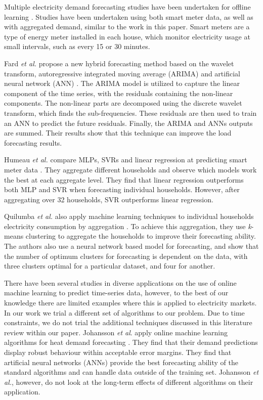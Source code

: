 \documentclass[final,3p,times,twocolumn,numbers]{elsarticle}
\begin{document}
Multiple electricity demand forecasting studies have been undertaken for offline learning \cite{Chen2004, Gross1987, Ghofrani}. Studies have been undertaken using both smart meter data, as well as with aggregated demand, similar to the work in this paper. Smart meters are a type of energy meter installed in each house, which monitor electricity usage at small intervals, such as every 15 or 30 minutes.

Fard \textit{et al.} propose a new hybrid forecasting method based on the wavelet transform, autoregressive integrated moving average (ARIMA) and artificial neural network (ANN) \cite{Fard2014}. The ARIMA model is utilized to capture the linear component of the time series, with the residuals containing the non-linear components. The non-linear parts are decomposed using the discrete wavelet transform, which finds the sub-frequencies. These residuals are then used to train an ANN  to predict the future residuals. Finally, the ARIMA and ANNs outputs are summed. Their results show that this technique can improve the load forecasting results.	

Humeau \textit{et al.} compare MLPs, SVRs and linear regression at predicting smart meter data \cite{Humeau2013}. They aggregate different households and observe which models work the best at each aggregate level. They find that linear regression outperforms both MLP and SVR when forecasting individual households. However, after aggregating over 32 households, SVR outperforms linear regression.


Quilumba \textit{et al.} also apply machine learning techniques to individual households electricity consumption by aggregation \cite{Fard2014}. To achieve this aggregation, they use \textit{k}-means clustering to aggregate the households to improve their forecasting ability. The authors also use a neural network based model for forecasting, and show that the number of optimum clusters for forecasting is dependent on the data, with three clusters optimal for a particular dataset, and four for another.

There have been several studies in diverse applications on the use of online machine learning to predict time-series data, however, to the best of our knowledge there are limited examples where this is applied to electricity markets. In our work we trial a different set of algorithms to our problem. Due to time constraints, we do not trial the additional techniques discussed in this literature review within our paper. Johansson \textit{et al}. apply online machine learning algorithms for heat demand forecasting \cite{Johansson2017}. They find that their demand predictions display robust behaviour within acceptable error margins. They find that artificial neural networks (ANNs) provide the best forecasting ability of the standard algorithms and can handle data outside of the training set. Johansson \textit{et al.}, however, do not look at the long-term effects of different algorithms on their application.
\end{document}
